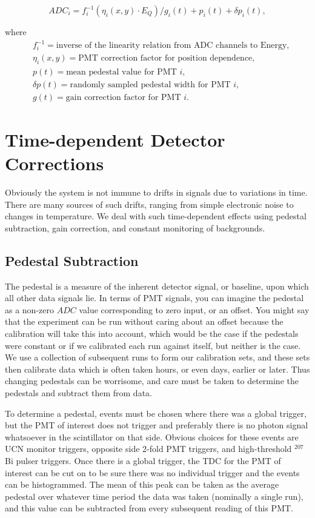 \begin{equation} \label{eq:pmtResponse}
ADC_i = f_i^{-1}\left(\eta_i(x,y) \cdot E_Q \right)/g_i(t) + p_i(t) + \delta p_i(t) ,
\end{equation}

\noindent where 
\begin{align*}
&f_i^{-1} = \textrm{inverse of the linearity relation from ADC channels to Energy,}\\
&\eta_i(x,y) = \textrm{PMT correction factor for position dependence,} \\
&p(t) = \textrm{mean pedestal value for PMT } i,\\
&\delta p(t) = \textrm{randomly sampled pedestal width for PMT }i,\\
&g(t) = \textrm{gain correction factor for PMT }i.
\end{align*}



\section{Time-dependent Detector Corrections}

Obviously the system is not immune to drifts in signals due to variations
in time. There are many sources of such drifts, ranging from simple
electronic noise to changes in temperature. We deal with such time-dependent
effects using pedestal subtraction, gain correction, and constant monitoring
of backgrounds.

\subsection{Pedestal Subtraction}
The pedestal is a measure of the inherent detector signal, or baseline, 
upon which all other data signals lie. In terms of PMT signals, you can imagine 
the pedestal as a non-zero $ADC$ value corresponding to zero input, or an offset.
You might say that the experiment can be run without caring about an offset
because the calibration will take this into account, which would be the case 
if the pedestals were constant or if we calibrated each run against itself, but 
neither is the case. We use a collection of subsequent runs to form our 
calibration sets, and these sets then calibrate data which is often taken hours,
or even days, earlier or later. Thus changing pedestals can be worrisome, and care
must be taken to determine the pedestals and subtract them from data.

To determine a pedestal, events must be chosen where there was a global trigger, but
the PMT of interest does not trigger and preferably there is no photon signal
whatsoever in the scintillator on that side. Obvious choices for these events are
UCN monitor triggers, opposite side 2-fold PMT triggers, and high-threshold $^{207}$Bi
pulser triggers. Once there is a global trigger, the TDC for the PMT of interest can 
be cut on to be sure there was no individual trigger and the events can be 
histogrammed. The mean of this peak can be taken as the average pedestal over whatever
time period the data was taken (nominally a single run), and this value can be 
subtracted from every subsequent reading of this PMT.

